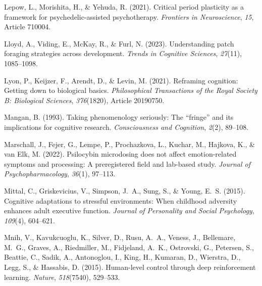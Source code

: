 \documentclass[12pt,fleqn]{article}
\begin{document}
\begin{thebibliography}{}
  Lepow, L., Morishita, H., \& Yehuda, R. (2021).
  Critical period plasticity as a framework for psychedelic-assisted psychotherapy.
  \emph{Frontiers in Neuroscience}, \emph{15}, Article 710004.

  Lloyd, A., Viding, E., McKay, R., \& Furl, N. (2023).
  Understanding patch foraging strategies across development.
  \emph{Trends in Cognitive Sciences}, \emph{27}(11), 1085--1098.

  Lyon, P., Keijzer, F., Arendt, D., \& Levin, M. (2021).
  Reframing cognition: Getting down to biological basics.
  \emph{Philosophical Transactions of the Royal Society B: Biological Sciences}, \emph{376}(1820), Article 20190750.

  Mangan, B. (1993).
  Taking phenomenology seriously: The ``fringe'' and its implications for cognitive research.
  \emph{Consciousness and Cognition}, \emph{2}(2), 89--108.

  Marschall, J., Fejer, G., Lempe, P., Prochazkova, L., Kuchar, M., Hajkova, K., \& van Elk, M. (2022).
  Psilocybin microdosing does not affect emotion-related symptoms and processing: A preregistered field and lab-based study.
  \emph{Journal of Psychopharmacology}, \emph{36}(1), 97--113.

  Mittal, C., Griskevicius, V., Simpson, J.~A., Sung, S., \& Young, E.~S. (2015).
  Cognitive adaptations to stressful environments: When childhood adversity enhances adult executive function.
  \emph{Journal of Personality and Social Psychology}, \emph{109}(4), 604--621.

  Mnih, V., Kavukcuoglu, K., Silver, D., Rusu, A.~A., Veness, J., Bellemare, M.~G., Graves, A., Riedmiller, M., Fidjeland, A.~K., Ostrovski, G., Petersen, S., Beattie, C., Sadik, A., Antonoglou, I., King, H., Kumaran, D., Wierstra, D., Legg, S., \& Hassabis, D. (2015).
  Human-level control through deep reinforcement learning.
  \emph{Nature}, \emph{518}(7540), 529--533.


\end{thebibliography}
\end{document}
